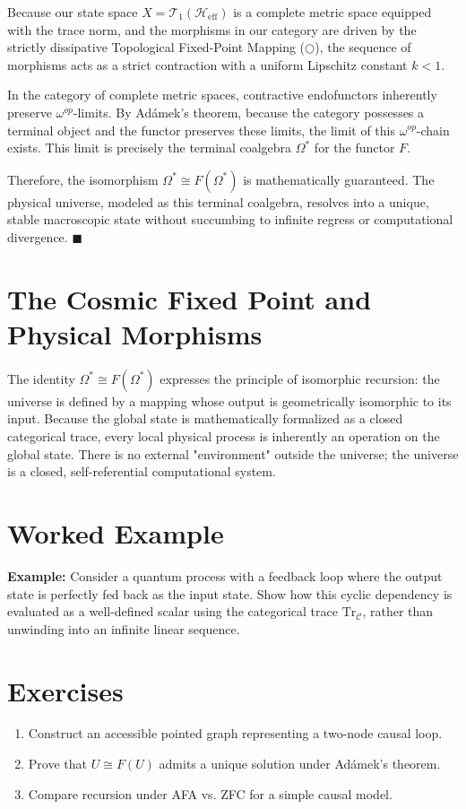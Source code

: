 \documentclass[12pt,openany]{book}
\theoremstyle{plain}
\theoremstyle{definition}
\theoremstyle{remark}
\begin{document}
Because our state space $X = \mathcal{T}_1(\mathcal{H}_{\text{eff}})$ is a complete metric space equipped with the trace norm, and the morphisms in our category are driven by the strictly dissipative Topological Fixed-Point Mapping ($\bigcirc$), the sequence of morphisms acts as a strict contraction with a uniform Lipschitz constant $k < 1$. 

In the category of complete metric spaces, contractive endofunctors inherently preserve $\omega^{op}$-limits. By Adámek's theorem, because the category possesses a terminal object and the functor preserves these limits, the limit of this $\omega^{op}$-chain exists. This limit is precisely the terminal coalgebra $\Omega^*$ for the functor $F$. 

Therefore, the isomorphism $\Omega^* \cong F(\Omega^*)$ is mathematically guaranteed. The physical universe, modeled as this terminal coalgebra, resolves into a unique, stable macroscopic state without succumbing to infinite regress or computational divergence. \hfill $\blacksquare$

\section{The Cosmic Fixed Point and Physical Morphisms}

The identity $\Omega^* \cong F(\Omega^*)$ expresses the principle of isomorphic recursion: the universe is defined by a mapping whose output is geometrically isomorphic to its input. Because the global state is mathematically formalized as a closed categorical trace, every local physical process is inherently an operation on the global state. There is no external "environment" outside the universe; the universe is a closed, self-referential computational system.

\section{Worked Example}

\textbf{Example:} Consider a quantum process with a feedback loop where the output state is perfectly fed back as the input state. Show how this cyclic dependency is evaluated as a well-defined scalar using the categorical trace $\text{Tr}_{\mathcal{C}}$, rather than unwinding into an infinite linear sequence.

\section{Exercises}
\begin{enumerate}
    \item Construct an accessible pointed graph representing a two-node causal loop.
    \item Prove that $U \cong F(U)$ admits a unique solution under Adámek’s theorem.
    \item Compare recursion under AFA vs. ZFC for a simple causal model.
\end{enumerate}
\end{document}
